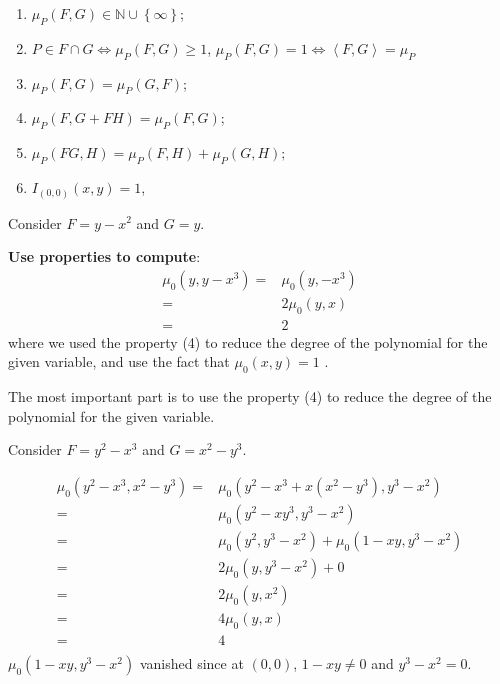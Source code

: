 \documentclass[10pt]{article}
\begin{document}
\begin{proposition}
  \begin{enumerate}[(1)]
    \item $ \mu_{P}(F,G) \in \mathbb{N} \cup \left\{ \infty  \right\}$;
    \item $ P \in F \cap G \Leftrightarrow \mu_{P}(F,G) \ge 1$, $ \mu_{P}(F,G) = 1 \Leftrightarrow \left< F,G \right> = \mu_{P}$
    \item $ \mu_{P}(F,G) = \mu_{P}(G,F)$;
    \item $ \mu_{P}(F, G+FH) = \mu_{P}(F,G)$;
    \item $ \mu_{P}(FG, H) = \mu_{P}(F,H) + \mu_{P}(G,H);$
    \item $ I_{(0,0)}(x,y) = 1$,
  \end{enumerate}
\end{proposition}

\begin{example}
  Consider $ F = y - x^{2}$ and $ G = y$.
\end{example}
\begin{solution}
  \textbf{Use properties to compute}:
  \begin{equation*}
    \begin{aligned}
      \mu_{0}(y, y - x^{3}) = & \mu_{0}(y , - x^3) \\
      = & 2 \mu_{0} (y,x) \\
      = & 2
    \end{aligned}
  \end{equation*}
  where we used the property (4) to reduce the degree of the polynomial for the given variable, and use the fact that $ \mu_{0}(x,y) = 1$ .
\end{solution}
The most important part is to use the property (4) to reduce the degree of the polynomial for the given variable.
\begin{example}
  Consider $ F = y^{2} - x^{3}$ and $ G = x^{2} - y^{3}$.
\end{example}
\begin{solution}
  \begin{equation*}
    \begin{aligned}
      \mu_{0}(y^{2} - x^{3}, x^{2} - y^{3}) = & \mu_{0}(y^{2} - x^{3} + x (x^{2} - y^{3}), y^{3} - x^{2}) \\
      = & \mu_{0}(y^{2} - x y^{3}, y^{3} - x^{2}) \\
      = & \mu_{0}(y^{2}, y^{3} - x^{2}) + \mu_{0}(1 - x y, y^{3} - x^{2}) \\
      = & 2 \mu_{0}(y, y^{3} - x^{2}) + 0\\
      = & 2 \mu_{0}(y, x^{2})\\
      = & 4 \mu_{0}(y,x) \\
      = & 4\\
    \end{aligned}
  \end{equation*}
  $ \mu_{0}(1-xy, y^{3} - x^{2})$ vanished since at $ (0,0)$, $ 1 - xy \neq 0$ and $ y^{3} - x^{2} = 0$.
\end{solution}
\end{document}
